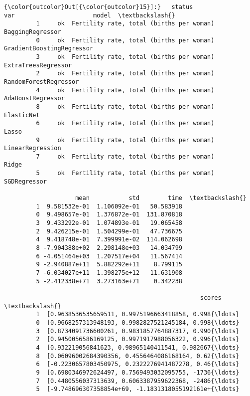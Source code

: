 \documentclass[11pt]{article}
\begin{document}
\begin{Verbatim}[commandchars=\\\{\}]
{\color{outcolor}Out[{\color{outcolor}15}]:}   status                                       var                      model  \textbackslash{}
         1     ok  Fertility rate, total (births per woman)           BaggingRegressor   
         0     ok  Fertility rate, total (births per woman)  GradientBoostingRegressor   
         3     ok  Fertility rate, total (births per woman)        ExtraTreesRegressor   
         2     ok  Fertility rate, total (births per woman)      RandomForestRegressor   
         4     ok  Fertility rate, total (births per woman)          AdaBoostRegressor   
         8     ok  Fertility rate, total (births per woman)                 ElasticNet   
         6     ok  Fertility rate, total (births per woman)                      Lasso   
         9     ok  Fertility rate, total (births per woman)           LinearRegression   
         7     ok  Fertility rate, total (births per woman)                      Ridge   
         5     ok  Fertility rate, total (births per woman)               SGDRegressor   
         
                    mean           std        time  \textbackslash{}
         1  9.581532e-01  1.106092e-01   50.583918   
         0  9.498657e-01  1.376872e-01  131.870818   
         3  9.433292e-01  1.074893e-01   19.065458   
         2  9.426215e-01  1.504299e-01   47.736675   
         4  9.418748e-01  7.399991e-02  114.062698   
         8 -7.904388e+02  2.298148e+03   14.034799   
         6 -4.051464e+03  1.207517e+04   11.567414   
         9 -2.940887e+11  5.882292e+11    8.799115   
         7 -6.034027e+11  1.398275e+12   11.631908   
         5 -2.412338e+71  3.273163e+71    0.342238   
         
                                                       scores  \textbackslash{}
         1  [0.9638536535659511, 0.9975196663418858, 0.998{\ldots}   
         0  [0.9668257313948193, 0.9982827521245184, 0.998{\ldots}   
         3  [0.8734091736600261, 0.9831857764887317, 0.990{\ldots}   
         2  [0.9450056586169125, 0.9971917988056322, 0.996{\ldots}   
         4  [0.932219056841623, 0.98965140411541, 0.982667{\ldots}   
         8  [0.06096002684390356, 0.4556464086168164, 0.62{\ldots}   
         6  [-0.2230657803450975, 0.2322276941487278, 0.46{\ldots}   
         9  [0.6980346972624497, 0.7569493032095755, -1736{\ldots}   
         7  [0.4480556037313639, 0.6063387959622368, -2486{\ldots}   
         5  [-9.748696307358854e+69, -1.1831318055192161e+{\ldots}   
         

\end{Verbatim}
\end{document}
